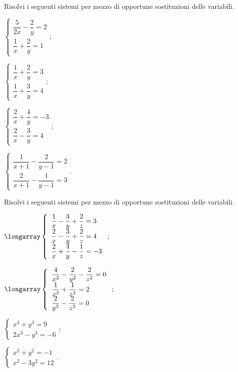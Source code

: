 \begin{esercizio}[\Ast]
 \label{ese:21.67}
 Risolvi i seguenti sistemi per mezzo di opportune sostituzioni delle variabili.
\begin{multicols}{2}
\begin{enumeratea}
{\longarray
\item $\left\{\begin{array}{l}\dfrac{5}{2x}-\dfrac{2}{y}=2\\\dfrac{1}{x}+\dfrac{2}{y}=1\end{array}\right.;$
\item $\left\{\begin{array}{l}\dfrac{1}{x}+\dfrac{2}{y}=3\\\dfrac{1}{x}+\dfrac{3}{y}=4\end{array}\right.;$
\item $\left\{\begin{array}{l}\dfrac{2}{x}+\dfrac{4}{y}=-3\\\dfrac{2}{x}-\dfrac{3}{y}=4 \end{array}\right.;$
\item $\left\{\begin{array}{l}\dfrac{1}{x+1}-\dfrac{2}{y-1}=2\\\dfrac{2}{x+1}-\dfrac{1}{y-1}=3\end{array}\right..$}
\end{enumeratea}
\end{multicols}
\end{esercizio}

\begin{esercizio}[\Ast]
 \label{ese:21.68}
 Risolvi i seguenti sistemi per mezzo di opportune sostituzioni delle variabili.
\begin{multicols}{2}
\begin{enumeratea}
\item $\longarray\left\{\begin{array}{l}\dfrac{1}{x}-\dfrac{3}{y}+\dfrac{2}{z}=3 \\\dfrac{2}{x}-\dfrac{3}{y}+\dfrac{2}{z}=4
\\\dfrac{2}{x}+\dfrac{4}{y}-\dfrac{1}{z}=-3\end{array}\right.;$
\item $\longarray\left\{\begin{array}{l}\dfrac{4}{x^{2}}-\dfrac{2}{y^{2}}-\dfrac{2}{z^{2}}=0\\\dfrac{1}{x^{2}}+\dfrac{1}{z^{2}}=2
\\\dfrac{2}{y^{2}}-\dfrac{2}{z^{2}}=0\end{array}\right.;$
\item $\left\{\begin{array}{l}x^{3}+y^{3}=9 \\2x^{3}-y^{3}=-6 \end{array}\right.;$
\item $\left\{\begin{array}{l}x^{2}+y^{2}=-1\\x^{2}-3y^{2}=12\end{array}\right..$
\end{enumeratea}
\end{multicols}
\end{esercizio}

